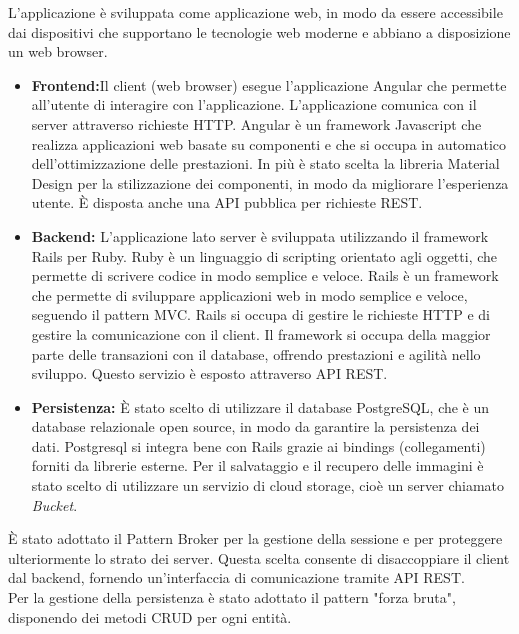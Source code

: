 L’applicazione è sviluppata come applicazione web, in modo da essere accessibile dai dispositivi che supportano le tecnologie web moderne e abbiano a disposizione un web browser.
\begin{itemize}
	\item \large{\textbf{Frontend:}}\newline Il client (web browser) esegue l'applicazione Angular che permette all'utente di interagire con l'applicazione. L'applicazione comunica con il server attraverso richieste HTTP. Angular è un framework Javascript che realizza applicazioni web basate su componenti e che si occupa in automatico dell'ottimizzazione delle prestazioni. In più è stato scelta la libreria Material Design per la stilizzazione dei componenti, in modo da migliorare l'esperienza utente. È disposta anche una API pubblica per richieste REST. 
	\item \large{\textbf{Backend:}}\newline
	L'applicazione lato server è sviluppata utilizzando il framework Rails per Ruby. Ruby è un linguaggio di scripting orientato agli oggetti, che permette di scrivere codice in modo semplice e veloce. Rails è un framework che permette di sviluppare applicazioni web in modo semplice e veloce, seguendo il pattern MVC. Rails si occupa di gestire le richieste HTTP e di gestire la comunicazione con il client. Il framework si occupa della maggior parte delle transazioni con il database, offrendo prestazioni e agilità nello sviluppo. Questo servizio è esposto attraverso API REST.
	\item \large{\textbf{Persistenza:}}\newline
	È stato scelto di utilizzare il database PostgreSQL, che è un database relazionale open source, in modo da garantire la persistenza dei dati. Postgresql si integra bene con Rails grazie ai bindings (collegamenti) forniti da librerie esterne.
	Per il salvataggio e il recupero delle immagini è stato scelto di utilizzare un servizio di cloud storage, cioè un server chiamato \textit{Bucket}.
\end{itemize}

È stato adottato il Pattern Broker per la gestione della sessione e per proteggere ulteriormente lo strato dei server. Questa scelta consente di disaccoppiare il client dal backend, fornendo un'interfaccia di comunicazione tramite API REST.\\

Per la gestione della persistenza è stato adottato il pattern "forza bruta", disponendo dei metodi CRUD per ogni entità.\\

